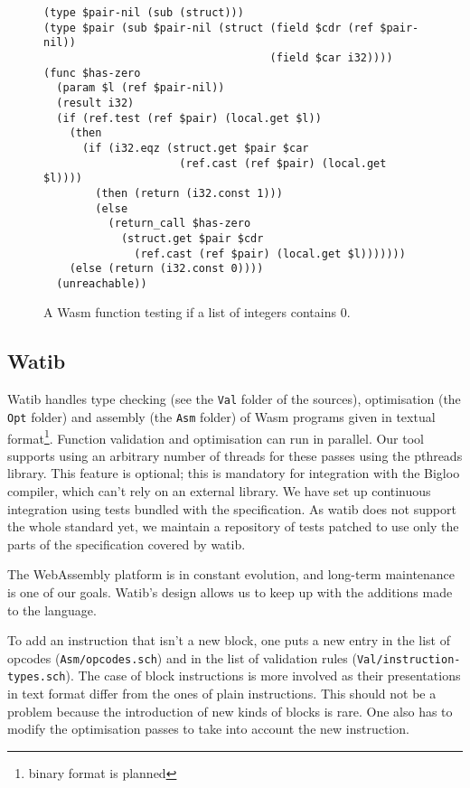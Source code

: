 \documentclass[a4paper,11pt]{article}
\begin{document}
\begin{figure}[h]
  \begin{minipage}{\widthof{(type \$pair (sub \$pair-nil (struct (field \$cdr (ref \$pair-nil))}}
\begin{lstlisting}
(type $pair-nil (sub (struct)))
(type $pair (sub $pair-nil (struct (field $cdr (ref $pair-nil))
                                   (field $car i32))))
(func $has-zero
  (param $l (ref $pair-nil))
  (result i32)
  (if (ref.test (ref $pair) (local.get $l))
    (then
      (if (i32.eqz (struct.get $pair $car
                     (ref.cast (ref $pair) (local.get $l))))
        (then (return (i32.const 1)))
        (else
          (return_call $has-zero
            (struct.get $pair $cdr
              (ref.cast (ref $pair) (local.get $l)))))))
    (else (return (i32.const 0))))
  (unreachable))
\end{lstlisting}
  \end{minipage}

  \caption{A Wasm function testing if a list of integers contains 0.}\label{ex}
\end{figure}

\subsection{Watib}
\textsf{Watib} handles type checking (see the \texttt{Val} folder of the
sources), optimisation (the \texttt{Opt} folder) and assembly (the \texttt{Asm}
folder) of Wasm programs given in textual format\footnote{binary format is
planned}. Function validation and optimisation can run in parallel. Our tool
supports using an arbitrary number of threads for these passes using the
\textsf{pthreads} library. This feature is optional; this is mandatory for
integration with the Bigloo compiler, which can't rely on an external library.
We have set up continuous integration using tests bundled with the
specification. As \textsf{watib} does not support the whole standard yet, we
maintain a repository of tests patched to use only the parts of the
specification covered by \textsf{watib}.

The WebAssembly platform is in constant evolution, and long-term maintenance is
one of our goals. \textsf{Watib}'s design allows us to keep up with the
additions made to the language.

To add an instruction that isn't a new block, one puts a new entry in the list
of opcodes (\texttt{Asm/opcodes.sch}) and in the list of validation rules
(\texttt{Val/instruction-types.sch}). The case of block instructions is more
involved as their presentations in text format differ from the ones of plain
instructions. This should not be a problem because the introduction of new kinds
of blocks is rare. One also has to modify the optimisation passes to take into
account the new instruction.
\end{document}
